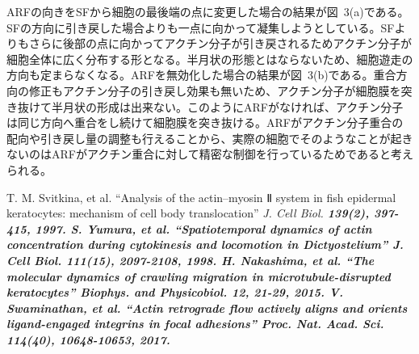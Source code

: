 \documentclass[10pt,twocolumn,a4j]{jarticle}
\begin{document}
ARFの向きをSFから細胞の最後端の点に変更した場合の結果が図~3(a)である。SFの方向に引き戻した場合よりも一点に向かって凝集しようとしている。SFよりもさらに後部の点に向かってアクチン分子が引き戻されるためアクチン分子が細胞全体に広く分布する形となる。半月状の形態とはならないため、細胞遊走の方向も定まらなくなる。ARFを無効化した場合の結果が図~3(b)である。重合方向の修正もアクチン分子の引き戻し効果も無いため、アクチン分子が細胞膜を突き抜けて半月状の形成は出来ない。このようにARFがなければ、アクチン分子は同じ方向へ重合をし続けて細胞膜を突き抜ける。ARFがアクチン分子重合の配向や引き戻し量の調整も行えることから、実際の細胞でそのようなことが起きないのはARFがアクチン重合に対して精密な制御を行っているためであると考えられる。

\begin{thebibliography}{9}
      T. M. Svitkina, et al.
    ``Analysis of the actin--myosin Ⅱ system in fish epidermal keratocytes: mechanism of cell body translocation''  \sl{J. Cell Biol.} \bf{139}\rm{(2)}, 397-415, 1997.
      S. Yumura, et al.
    ``Spatiotemporal dynamics of actin concentration during cytokinesis and locomotion in Dictyostelium''  \sl{J. Cell Biol.} \bf{111}\rm{(15)}, 2097-2108, 1998.
   H. Nakashima, et al.
    ``The molecular dynamics of crawling migration in microtubule-disrupted keratocytes''  \sl{Biophys. and Physicobiol.} \bf{12}\rm{}, 21-29, 2015.
        V. Swaminathan, et al.
    ``Actin retrograde flow actively aligns and orients ligand-engaged integrins in focal adhesions''  \sl{Proc. Nat. Acad. Sci.} \bf{114}\rm{(40)}, 10648-10653, 2017.
\end{thebibliography}
\end{document}
